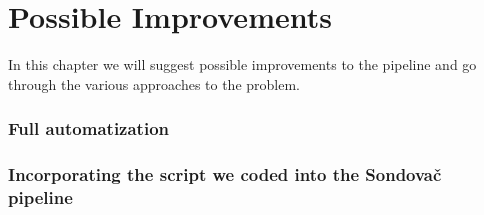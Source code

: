 \chapter[Possible Improvements]{Possible Improvements}
\label{kap:improvements}

In this chapter we will suggest possible improvements to the pipeline and go through the various approaches to the problem. 

\subsection{Full automatization}



\subsection{Incorporating the script we coded into the Sondovač pipeline}


